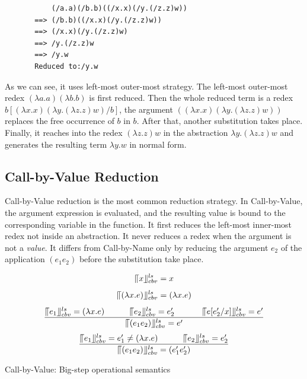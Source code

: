 \begin{verbatim}
           (/a.a)(/b.b)((/x.x)(/y.(/z.z)w))
       ==> (/b.b)((/x.x)(/y.(/z.z)w))
       ==> (/x.x)(/y.(/z.z)w)
       ==> /y.(/z.z)w
       ==> /y.w
       Reduced to:/y.w
\end{verbatim}


As we can see, it uses left-most outer-most strategy. The left-most outer-most redex $(\lambda a.a)(\lambda b.b)$ is first reduced. Then the whole reduced term is a redex $b[(\lambda x.x)(\lambda y.(\lambda z.z)w)/b]$, the argument $((\lambda x.x)(\lambda y.(\lambda z.z)w))$ replaces the free occurrence of $b$ in $b$. After that, another substitution takes place. Finally, it reaches into the redex $(\lambda z.z)w$ in the abstraction $\lambda y.(\lambda z.z)w$ and generates the resulting term $\lambda y.w$ in normal form.


\subsection{Call-by-Value Reduction}{\label{subsec:cbv}}

Call-by-Value reduction is the most common reduction strategy. In Call-by-Value, the argument expression is evaluated, and the resulting value is bound to the corresponding variable in the function. It first reduces the left-most inner-most redex not inside an abstraction. It never reduces a redex when the argument is not a \textit{value}. It differs from Call-by-Name only by reducing the argument $e_2$ of the application $(e_1e_2)$ before the substitution take place. 


\begin{equation*}
\llceil x \rrfloor ^{ls} _{cbv} = x
\end{equation*}
\begin{equation*}
\llceil (\lambda x.e) \rrfloor ^{ls} _{cbv} = (\lambda x.e)
\end{equation*}
\begin{equation*}
\frac{\llceil e_1 \rrfloor ^{ls} _{cbv} = (\lambda x.e)\ \ \ \ \ \ \ \ \ \llceil e_2 \rrfloor ^{ls} _{cbv} = e'_2\ \ \ \ \ \ \ \ \ \ \llceil e[e'_2/x] \rrfloor ^{ls} _{cbv}  = e'}{\llceil (e_1e_2) \rrfloor ^{ls} _{cbv} = e'}
\end{equation*}
\begin{equation*}
\frac{\llceil e_1 \rrfloor ^{ls} _{cbv} = e'_1\neq (\lambda x.e)\ \ \ \ \ \ \ \ \ \llceil e_2 \rrfloor ^{ls} _{cbv} = e'_2}{\llceil (e_1e_2) \rrfloor ^{ls} _{cbv} = (e'_1e'_2)}
\end{equation*}
\begin{center}
Call-by-Value: Big-step operational semantics
\end{center}


